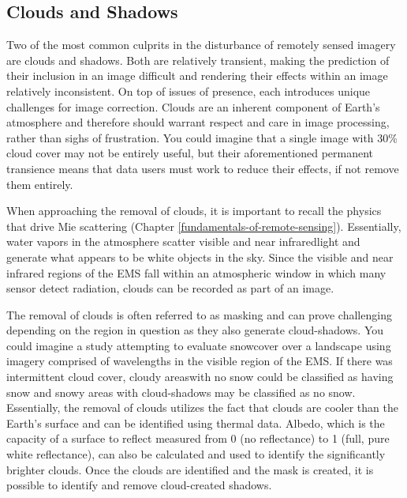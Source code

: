 \documentclass[
]{book}
\begin{document}
\hypertarget{clouds-and-shadows}{%
\subsection{Clouds and Shadows}\label{clouds-and-shadows}}

Two of the most common culprits in the disturbance of remotely sensed imagery are clouds and shadows. Both are relatively transient, making the prediction of their inclusion in an image difficult and rendering their effects within an image relatively inconsistent. On top of issues of presence, each introduces unique challenges for image correction. Clouds are an inherent component of Earth's atmosphere and therefore should warrant respect and care in image processing, rather than sighs of frustration. You could imagine that a single image with 30\% cloud cover may not be entirely useful, but their aforementioned permanent transience means that data users must work to reduce their effects, if not remove them entirely.

When approaching the removal of clouds, it is important to recall the physics that drive Mie scattering (Chapter \ref{fundamentals-of-remote-sensing}). Essentially, water vapors in the atmosphere scatter visible and near infraredlight and generate what appears to be white objects in the sky. Since the visible and near infrared regions of the EMS fall within an atmospheric window in which many sensor detect radiation, clouds can be recorded as part of an image.

The removal of clouds is often referred to as masking and can prove challenging depending on the region in question as they also generate cloud-shadows. You could imagine a study attempting to evaluate snowcover over a landscape using imagery comprised of wavelengths in the visible region of the EMS. If there was intermittent cloud cover, cloudy areaswith no snow could be classified as having snow and snowy areas with cloud-shadows may be classified as no snow. Essentially, the removal of clouds utilizes the fact that clouds are cooler than the Earth's surface and can be identified using thermal data. Albedo, which is the capacity of a surface to reflect measured from 0 (no reflectance) to 1 (full, pure white reflectance), can also be calculated and used to identify the significantly brighter clouds. Once the clouds are identified and the mask is created, it is possible to identify and remove cloud-created shadows.
\end{document}
